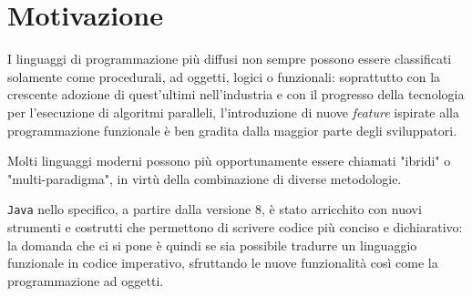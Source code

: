 \section{Motivazione}
\label{sec:1-1-motivation}

I linguaggi di programmazione più diffusi non sempre possono essere classificati
solamente come procedurali, ad oggetti, logici o funzionali: soprattutto con la crescente adozione di quest'ultimi
nell'industria e con il progresso della tecnologia per l'esecuzione di algoritmi paralleli, l'introduzione di nuove \textit{feature}
ispirate alla programmazione funzionale è ben gradita dalla maggior parte degli sviluppatori.

\noindent Molti linguaggi moderni possono più opportunamente essere chiamati "ibridi" o "multi-paradigma",
in virtù della combinazione di diverse metodologie.


\texttt{Java} nello specifico, a partire dalla versione 8, è stato arricchito con nuovi strumenti e costrutti
che permettono di scrivere codice più conciso e dichiarativo: la domanda che ci si pone è quindi se sia possibile tradurre
un linguaggio funzionale in codice imperativo, sfruttando le nuove funzionalità così come la programmazione ad oggetti.